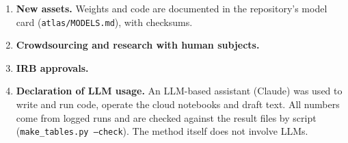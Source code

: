 \documentclass{article}
\begin{document}
\begin{enumerate}[leftmargin=1.5em,itemsep=3pt]
\item \textbf{New assets.} \answerYes{} Weights and code are documented in the repository's model card
(\texttt{atlas/MODELS.md}), with checksums.
\item \textbf{Crowdsourcing and research with human subjects.} \answerNA{}
\item \textbf{IRB approvals.} \answerNA{}
\item \textbf{Declaration of LLM usage.} \answerYes{} An LLM-based assistant (Claude) was used to write and run code,
operate the cloud notebooks and draft text. All numbers come from logged runs and are checked against the result files
by script (\texttt{make\_tables.py --check}). The method itself does not involve LLMs.
\end{enumerate}
\end{document}
